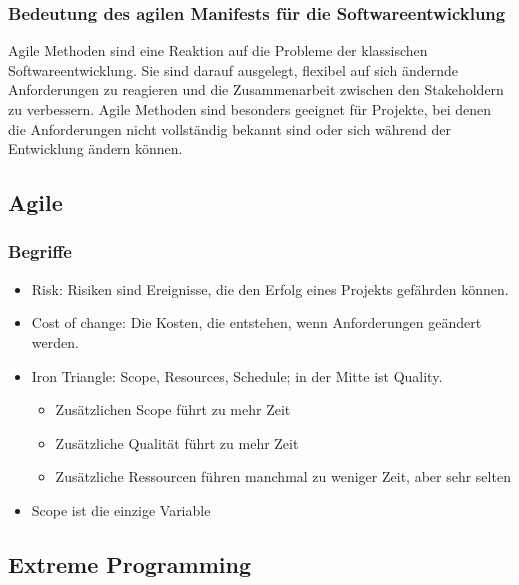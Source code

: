 \subsubsection{Bedeutung des agilen Manifests für die Softwareentwicklung}
Agile Methoden sind eine Reaktion auf die Probleme der klassischen Softwareentwicklung. Sie sind darauf ausgelegt, flexibel auf sich ändernde Anforderungen zu reagieren und die Zusammenarbeit zwischen den Stakeholdern zu verbessern. Agile Methoden sind besonders geeignet für Projekte, bei denen die Anforderungen nicht vollständig bekannt sind oder sich während der Entwicklung ändern können.

\subsection{Agile}
\subsubsection{Begriffe}
\begin{itemize}
    \item Risk: Risiken sind Ereignisse, die den Erfolg eines Projekts gefährden können.
    \item Cost of change: Die Kosten, die entstehen, wenn Anforderungen geändert werden.
    \item Iron Triangle: Scope, Resources, Schedule; in der Mitte ist Quality.
    \begin{itemize}
        \item Zusätzlichen Scope führt zu mehr Zeit
        \item Zusätzliche Qualität führt zu mehr Zeit
        \item Zusätzliche Ressourcen führen manchmal zu weniger Zeit, aber sehr selten
    \end{itemize}
    \item Scope ist die einzige Variable
\end{itemize}

\subsection{Extreme Programming}
